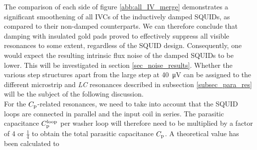 The comparison of each side of figure \ref{abb:all_IV_merge} demonstrates a significant smoothening of all IVCs of the inductively damped SQUIDs, as compared to their non-damped counterparts. We can therefore conclude that damping with insulated gold pads proved to effectively suppress all visible resonances to some extent, regardless of the SQUID design. Consequently, one would expect the resulting intrinsic flux noise of the damped SQUIDs to be lower. This will be investigated in section \ref{sec_noise_results}. Whether the various step structures apart from the large step at \qty{40}{\uV} can be assigned to the different microstrip and \textit{LC} resonances described in subsection \ref{subsec_para_res} will be the subject of the following discussion. \\

For the $C_{\rm p}$-related resonances, we need to take into account that the SQUID loops are connected in parallel and the input coil in series. The parasitic capacitance $C_{\rm p}^{\rm loop}$ per washer loop will therefore need to be multiplied by a factor of 4 or $\frac{1}{4}$ to obtain the total parasitic capacitance $C_{\rm p}$. A theoretical value has been calculated to \cite{EnpukuI1991, EnpukuIII1992}    
  

